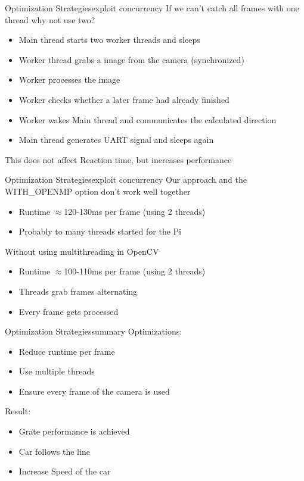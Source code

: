 \begin{frame}[plain]{Optimization Strategies}{exploit concurrency}
\pause
If we can't catch all frames with one thread why not use two?
\vspace{.5cm}
\begin{itemize}
	\pause
	\item Main thread starts two worker threads and sleeps
	\pause
	\item Worker thread grabs a image from the camera (synchronized)
	\pause
	\item Worker processes the image 
	\pause
	\item Worker checks whether a later frame had already finished
	\pause
	\item Worker wakes Main thread and communicates the calculated direction
	\pause
	\item Main thread generates UART signal and sleeps again
\pause
\end{itemize}
\vspace{.5cm}
This does not affect Reaction time, but increases performance
\end{frame}

\begin{frame}[plain]{Optimization Strategies}{exploit concurrency}
\pause
	Our approach and the WITH\_OPENMP option don't work well together
	\pause
		\begin{itemize}
			\item Runtime $\approx$120-130ms per frame (using 2 threads)
			\pause
			\item Probably to many threads started for the Pi
		\end{itemize}
		\pause
	Without using multithreading in OpenCV
		\begin{itemize}
		\pause
			\item Runtime $\approx$100-110ms per frame (using 2 threads)
			\pause
			\item Threads grab frames alternating
			\pause
			\item Every frame gets processed
		\end{itemize}
		
\end{frame}

\begin{frame}[plain]{Optimization Strategies}{summary}
	\large
	\pause
	Optimizations:
	\begin{itemize}
		\large
		\pause
		\item Reduce runtime per frame
		\pause
		\item Use multiple threads
		\pause
		\item Ensure every frame of the camera is used
	\end{itemize}
	\pause
	\vspace{1cm}
	Result: 
	\begin{itemize}
	\pause
		\item Grate performance is achieved
		\pause
		\item Car follows the line
		\pause
		\item Increase Speed of the car
	\end{itemize}			
\end{frame}